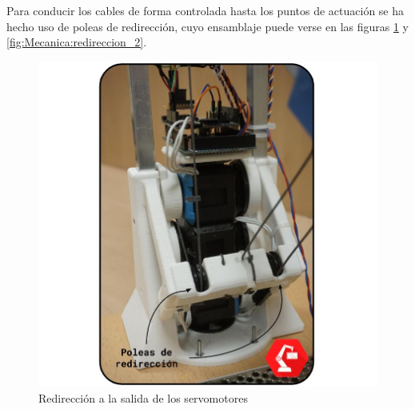     Para conducir los cables de forma controlada hasta los puntos de actuación se ha hecho uso de poleas de redirección, cuyo ensamblaje puede verse en las figuras \ref{fig:Mecanica:redireccion_1} y \ref{fig:Mecanica:redireccion_2}.

    \begin{minipage}{0.47\textwidth}
        \begin{figure}[H]
            \centering
            \includegraphics[width=\textwidth]{figuras/Imagenes_Mecanica/foto_brazo_6.jpg}
            \caption{Redirección a la salida de los servomotores}
            \label{fig:Mecanica:redireccion_1}
        \end{figure}
    \end{minipage}
